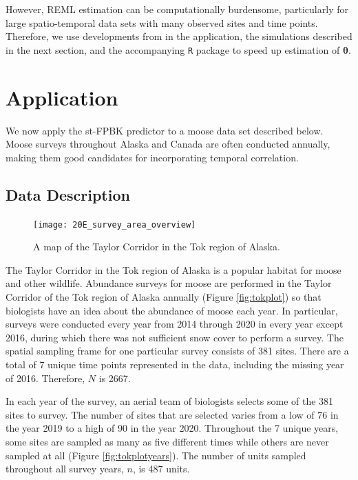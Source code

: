 \documentclass[]{interact}
\theoremstyle{plain}%
\theoremstyle{definition}
\theoremstyle{remark}
\begin{document}
However, REML estimation can be computationally burdensome, particularly
for large spatio-temporal data sets with many observed sites and time
points. Therefore, we use developments from \citet{dumelle2021linear} in
the application, the simulations described in the next section, and the
accompanying \texttt{R} package to speed up estimation of
\(\bm{\theta}\).

\section{Application} \label{section:Application}

We now apply the st-FPBK predictor to a moose data set described below.
Moose surveys throughout Alaska and Canada are often conducted annually,
making them good candidates for incorporating temporal correlation.

\subsection{Data Description}

\begin{figure}
\texttt{[image: 20E\_survey\_area\_overview]} \caption{\label{fig:tokplot} A map of the Taylor Corridor in the Tok region of Alaska.}\label{fig:unnamed-chunk-2}
\end{figure}

The Taylor Corridor in the Tok region of Alaska is a popular habitat for
moose and other wildlife. Abundance surveys for moose are performed in
the Taylor Corridor of the Tok region of Alaska annually (Figure
\ref{fig:tokplot}) so that biologists have an idea about the abundance
of moose each year. In particular, surveys were conducted every year
from 2014 through 2020 in every year except 2016, during which there was
not sufficient snow cover to perform a survey. The spatial sampling
frame for one particular survey consists of 381 sites. There are a total
of 7 unique time points represented in the data, including the missing
year of 2016. Therefore, \(N\) is 2667.

In each year of the survey, an aerial team of biologists selects some of
the 381 sites to survey. The number of sites that are selected varies
from a low of 76 in the year 2019 to a high of 90 in the year 2020.
Throughout the 7 unique years, some sites are sampled as many as five
different times while others are never sampled at all (Figure
\ref{fig:tokplotyears}). The number of units sampled throughout all
survey years, \(n\), is 487 units.
\end{document}
